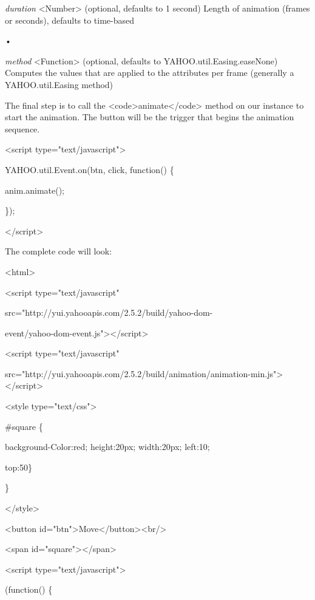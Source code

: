 \documentclass[
]{article}
\begin{document}
\emph{duration} \textless Number\textgreater{} (optional, defaults to 1
second) Length of animation (frames or seconds), defaults to time-based

•

\emph{method} \textless Function\textgreater{} (optional, defaults to
YAHOO.util.Easing.easeNone) Computes the values that are applied to the
attributes per frame (generally a YAHOO.util.Easing method)

The final step is to call the
\textless code\textgreater animate\textless/code\textgreater{} method on
our instance to start the animation. The button will be the trigger that
begins the animation sequence.

\textless script type="text/javascript"\textgreater{}

YAHOO.util.Event.on(\textquotesingle btn\textquotesingle,
\textquotesingle click\textquotesingle, function() \{

anim.animate();

\});

\textless/script\textgreater{}

The complete code will look:

\textless html\textgreater{}

\textless script type="text/javascript"

src="http://yui.yahooapis.com/2.5.2/build/yahoo-dom-

event/yahoo-dom-event.js"\textgreater\textless/script\textgreater{}

\textless script type="text/javascript"

src="http://yui.yahooapis.com/2.5.2/build/animation/animation-min.js"\textgreater\textless/script\textgreater{}

\textless style type="text/css"\textgreater{}

\#square \{

background-Color:red; height:20px; width:20px; left:10;

top:50\}

\}

\textless/style\textgreater{}

\textless button
id="btn"\textgreater Move\textless/button\textgreater\textless br/\textgreater{}

\textless span id="square"\textgreater\textless/span\textgreater{}

\textless script type="text/javascript"\textgreater{}

(function() \{
\end{document}
